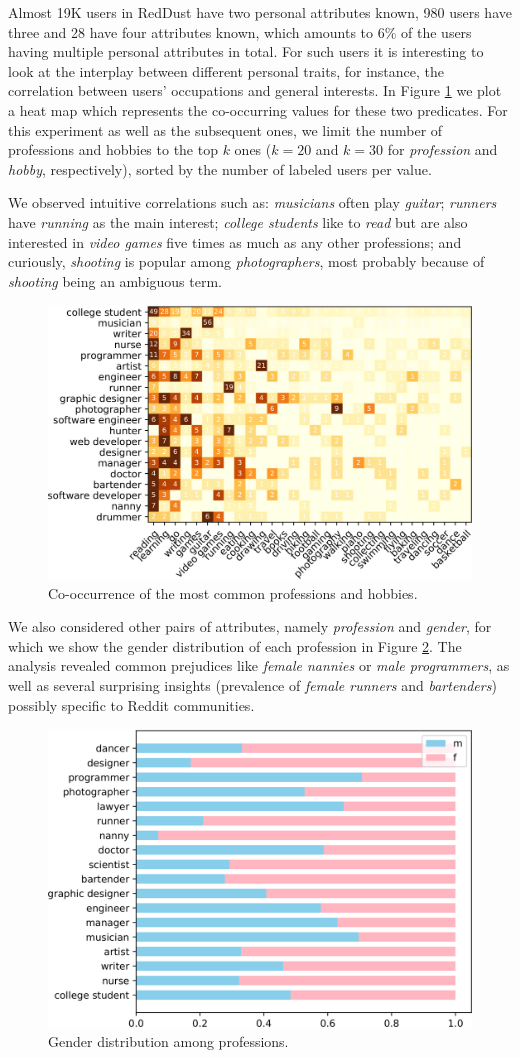 Almost 19K users in RedDust have two personal attributes known, 980 users have three and 28 have four attributes known,
which amounts to 6\% of the users having multiple personal attributes in total.
For  
such users
it is interesting to look at the interplay between different personal traits, for instance, the correlation between users' occupations and general interests.
In Figure \ref{prof-hob} we plot a heat map which represents the co-occurring values for these two predicates. 
For this experiment as well as the subsequent ones, we limit the number of professions and hobbies to the top $k$ ones ($k=20$ and $k=30$ for \textit{profession} and \textit{hobby}, respectively), sorted by the number of labeled users per value.

We observed intuitive correlations such as:
\emph{musicians} often play \emph{guitar};
\emph{runners} have \emph{running} as the main interest; 
\emph{college students} like to \emph{read} but are also interested in \emph{video games} five times as much as any other professions;
and curiously, \emph{shooting} is popular among \emph{photographers}, most probably because of \textit{shooting} being an ambiguous term.

\begin{figure}[]
  \centering
  \includegraphics[width=0.77\linewidth]{data/pics/hob_prof.png}
  \caption{Co-occurrence of the most common professions and hobbies.}
  \label{prof-hob}
\end{figure}

We also considered other pairs of attributes, namely \textit{profession} and \textit{gender}, for which we show the gender distribution of each profession in Figure \ref{prof_gender}. 
The analysis revealed common prejudices like \emph{female nannies} or \emph{male programmers},  
as well as several surprising insights (prevalence of \textit{female runners} and \textit{bartenders}) possibly specific to Reddit communities.

\begin{figure}[]
\centering
\includegraphics[width=0.67\linewidth]{data/pics/prof_gend.png}
\caption{Gender distribution among professions.}
\label{prof_gender}
\end{figure}